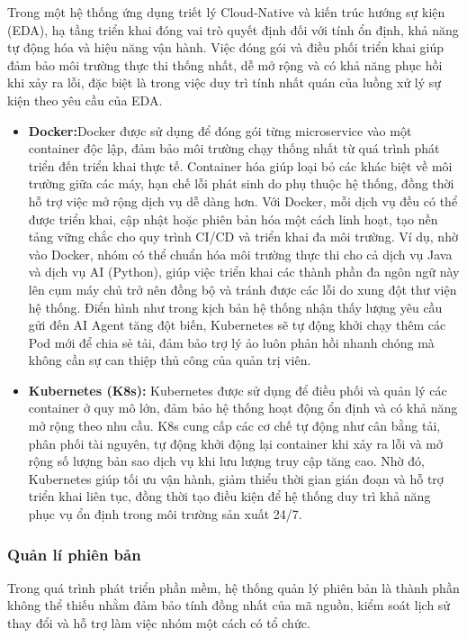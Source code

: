 Trong một hệ thống ứng dụng triết lý Cloud-Native và kiến trúc hướng sự kiện (EDA), hạ tầng triển khai đóng vai trò quyết định đối với tính ổn định, khả năng tự động hóa và hiệu năng vận hành. Việc đóng gói và điều phối triển khai giúp đảm bảo môi trường thực thi thống nhất, dễ mở rộng và có khả năng phục hồi khi xảy ra lỗi, đặc biệt là trong việc duy trì tính nhất quán của luồng xử lý sự kiện theo yêu cầu của EDA.

\begin{itemize}
    \item \textbf{Docker:}Docker được sử dụng để đóng gói từng microservice vào một container độc lập, đảm bảo môi trường chạy thống nhất từ quá trình phát triển đến triển khai thực tế. Container hóa giúp loại bỏ các khác biệt về môi trường giữa các máy, hạn chế lỗi phát sinh do phụ thuộc hệ thống, đồng thời hỗ trợ việc mở rộng dịch vụ dễ dàng hơn. Với Docker, mỗi dịch vụ đều có thể được triển khai, cập nhật hoặc phiên bản hóa một cách linh hoạt, tạo nền tảng vững chắc cho quy trình CI/CD và triển khai đa môi trường. Ví dụ, nhờ vào Docker, nhóm có thể chuẩn hóa môi trường thực thi cho cả dịch vụ Java và dịch vụ AI (Python), giúp việc triển khai các thành phần đa ngôn ngữ này lên cụm máy chủ trở nên đồng bộ và tránh được các lỗi do xung đột thư viện hệ thống. Điển hình như trong kịch bản hệ thống nhận thấy lượng yêu cầu gửi đến AI Agent tăng đột biến, Kubernetes sẽ tự động khởi chạy thêm các Pod mới để chia sẻ tải, đảm bảo trợ lý ảo luôn phản hồi nhanh chóng mà không cần sự can thiệp thủ công của quản trị viên.
    \item \textbf{Kubernetes (K8s): }Kubernetes được sử dụng để điều phối và quản lý các container ở quy mô lớn, đảm bảo hệ thống hoạt động ổn định và có khả năng mở rộng theo nhu cầu\cite{k8s_orchestration}. K8s cung cấp các cơ chế tự động như cân bằng tải, phân phối tài nguyên, tự động khởi động lại container khi xảy ra lỗi và mở rộng số lượng bản sao dịch vụ khi lưu lượng truy cập tăng cao. Nhờ đó, Kubernetes giúp tối ưu vận hành, giảm thiểu thời gian gián đoạn và hỗ trợ triển khai liên tục, đồng thời tạo điều kiện để hệ thống duy trì khả năng phục vụ ổn định trong môi trường sản xuất 24/7\cite{k8s_autoscaling}.
\end{itemize}

\subsubsection{Quản lí phiên bản}
Trong quá trình phát triển phần mềm, hệ thống quản lý phiên bản là thành phần không thể thiếu nhằm đảm bảo tính đồng nhất của mã nguồn, kiểm soát lịch sử thay đổi và hỗ trợ làm việc nhóm một cách có tổ chức.

